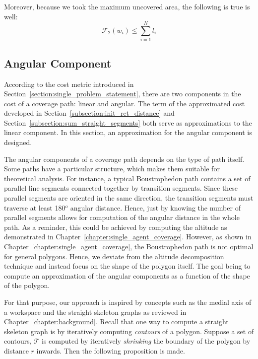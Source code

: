 \documentclass[../main.tex]{subfiles}
\begin{document}
Moreover, because we took the maximum uncovered area, the following is true is well:
\begin{equation}
	\mathcal{F}_2(w_i)\leq\sum_{i=1}^Nl_i
\end{equation}


\subsection{Angular Component}
\label{subsection:angular_component}


According to the cost metric introduced in Section~\ref{section:single_problem_statement}, there are two components in the cost of a coverage path: linear and angular. The term of the approximated cost developed in Section~\ref{subsection:init_ret_distance} and Section~\ref{subsection:sum_straight_segments} both serve as approximations to the linear component. In this section, an approximation for the angular component is designed.

The angular components of a coverage path depends on the type of path itself. Some paths have a particular structure, which makes them suitable for theoretical analysis. For instance, a typical Boustrophedon path contains a set of parallel line segments connected together by transition segments. Since these parallel segments are oriented in the same direction, the transition segments must traverse at least 180$^o$ angular distance. Hence, just by knowing the number of parallel segments allows for computation of the angular distance in the whole path. As a reminder, this could be achieved by computing the altitude as demonstrated in Chapter~\ref{chapter:single_agent_coverage}. However, as shown in Chapter~\ref{chapter:single_agent_coverage}, the Boustrophedon path is not optimal for general polygons. Hence, we deviate from the altitude decomposition technique and instead focus on the shape of the polygon itself. The goal being to compute an approximation of the angular components as a function of the shape of the polygon.

For that purpose, our approach is inspired by concepts such as the medial axis of a workspace and the straight skeleton graphs as reviewed in Chapter~\ref{chapter:background}. Recall that one way to compute a straight skeleton graph is by iteratively computing \emph{contours} of a polygon. Suppose a set of contours, $\mathcal{T}$ is computed by iteratively \emph{shrinking} the boundary of the polygon by distance $r$ inwards. Then the following proposition is made.
\end{document}
